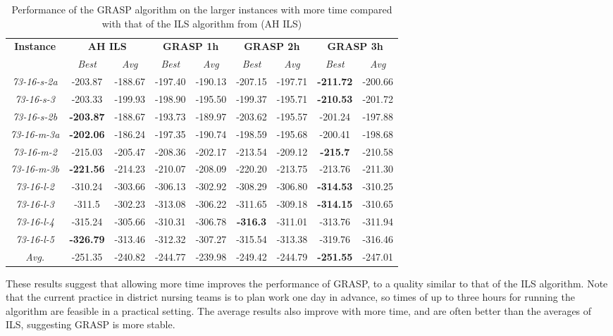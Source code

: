 \documentclass[a4paper,11pt,authoryear]{elsarticle}
\begin{document}
{\scriptsize
\begin{longtable}{c|cc|cc|cc|cc}
\caption{Performance of the GRASP algorithm on the larger instances with more time compared with that of the ILS algorithm from \cite{aithaddadene2016} (AH ILS)}
\label{table:longerexperiments}\\
\hline
\textbf{Instance}  & \multicolumn{2}{c|}{\textbf{AH ILS}} & \multicolumn{2}{c|}{\textbf{GRASP 1h}} & \multicolumn{2}{c|}{\textbf{GRASP 2h}} & \multicolumn{2}{c}{\textbf{GRASP 3h}}\\
    & \emph{Best} & \emph{Avg} & \emph{Best} & \emph{Avg} & \emph{Best} & \emph{Avg} & \emph{Best} & \emph{Avg}\\
\hline                                              
    \hline																		
        \emph{73-16-s-2a}   	&	-203.87	&	-188.67	&	-197.40	&	-190.13	&	-207.15	&	-197.71	&	\textbf{-211.72}	&	-200.66	    \\	
        \emph{73-16-s-3}    	&	-203.33	&	-199.93	&	-198.90	&	-195.50	&	-199.37	&	-195.71	&	\textbf{-210.53}	&	-201.72	    \\	
        \emph{73-16-s-2b}   	&	\textbf{-203.87}	&	-188.67	&	-193.73	&	-189.97	&	-203.62	&	-195.57	&	-201.24	&	-197.88	    \\	
        \emph{73-16-m-3a}   	&	\textbf{-202.06}	&	-186.24	&	-197.35	&	-190.74	&	-198.59	&	-195.68	&	-200.41	&	-198.68	    \\	
        \emph{73-16-m-2}    	&	-215.03	&	-205.47	&	-208.36	&	-202.17	&	-213.54	&	-209.12	&	\textbf{-215.7}	&	-210.58	    \\	
        \emph{73-16-m-3b}   	&	\textbf{-221.56}	&	-214.23	&	-210.07	&	-208.09	&	-220.20	&	-213.75	&	-213.76	&	-211.30	    \\	
        \emph{73-16-l-2}    	&	-310.24	&	-303.66	&	-306.13	&	-302.92	&	-308.29	&	-306.80	&	\textbf{-314.53}	&	-310.25	    \\	
        \emph{73-16-l-3}    	&	-311.5	&	-302.23	&	-313.08	&	-306.22	&	-311.65	&	-309.18	&	\textbf{-314.15}	&	-310.65	    \\	
        \emph{73-16-l-4}    	&	-315.24	&	-305.66	&	-310.31	&	-306.78	&	\textbf{-316.3}	&	-311.01	&	-313.76	&	-311.94	    \\	
        \emph{73-16-l-5}    	&	\textbf{-326.79}	&	-313.46	&	-312.32	&	-307.27	&	-315.54	&	-313.38	&	-319.76	&	-316.46	    \\	\hline
\emph{Avg.}	&	-251.35	&	-240.82	&	-244.77	&	-239.98	&	-249.42	&	-244.79	&	\textbf{-251.55}	&	-247.01	    \\	

\hline
\end{longtable}
}

\noindent These results suggest that allowing more time improves the performance of GRASP, to a quality similar to that of the ILS algorithm. Note that the current practice in district nursing teams is to plan work one day in advance, so times of up to three hours for running the algorithm are feasible in a practical setting. The average results also improve with more time, and are often better than the averages of ILS, suggesting GRASP is more stable. 
\end{document}
